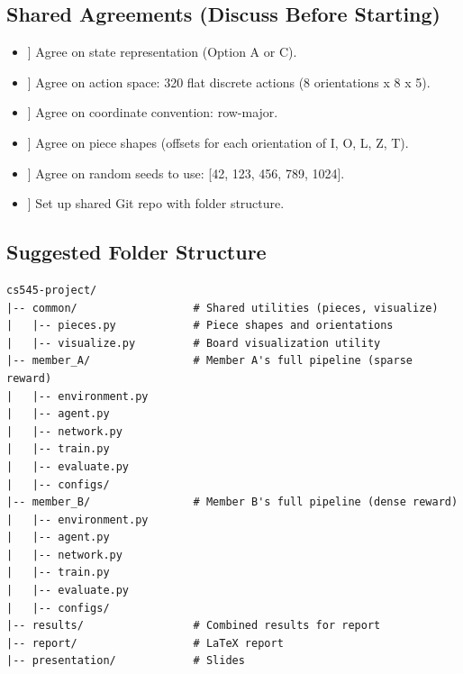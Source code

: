 \documentclass[11pt,a4paper]{article}
\begin{document}
\subsection{Shared Agreements (Discuss Before Starting)}
\begin{itemize}
    \item[ [ ] ] Agree on state representation (Option A or C).
    \item[ [ ] ] Agree on action space: 320 flat discrete actions (8 orientations x 8 x 5).
    \item[ [ ] ] Agree on coordinate convention: row-major.
    \item[ [ ] ] Agree on piece shapes (offsets for each orientation of I, O, L, Z, T).
    \item[ [ ] ] Agree on random seeds to use: [42, 123, 456, 789, 1024].
    \item[ [ ] ] Set up shared Git repo with folder structure.
\end{itemize}

\subsection{Suggested Folder Structure}
\begin{verbatim}
cs545-project/
|-- common/                  # Shared utilities (pieces, visualize)
|   |-- pieces.py            # Piece shapes and orientations
|   |-- visualize.py         # Board visualization utility
|-- member_A/                # Member A's full pipeline (sparse reward)
|   |-- environment.py       
|   |-- agent.py             
|   |-- network.py           
|   |-- train.py             
|   |-- evaluate.py          
|   |-- configs/             
|-- member_B/                # Member B's full pipeline (dense reward)
|   |-- environment.py       
|   |-- agent.py             
|   |-- network.py           
|   |-- train.py             
|   |-- evaluate.py          
|   |-- configs/             
|-- results/                 # Combined results for report
|-- report/                  # LaTeX report
|-- presentation/            # Slides
\end{verbatim}
\end{document}
